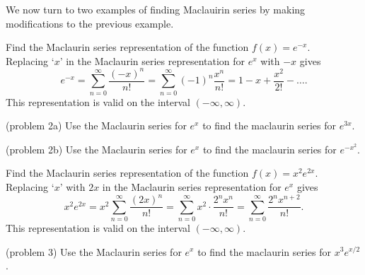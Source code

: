 \documentclass[handout]{ximera}
\begin{document}
We now turn to two examples of finding Maclauirin series by making modifications to the previous example.

\begin{example}[example 2] 
Find the Maclaurin series representation of the function $f(x) = e^{-x}$.\\
Replacing `$x$' in the Maclaurin series representation for $e^x$ with $-x$ gives
\[
e^{-x} = \sum_{n=0}^\infty \frac{(-x)^n}{n!} = \sum_{n=0}^\infty (-1)^n \frac{x^n}{n!} = 1 - x + \frac{x^2}{2!} - \dots.
\]
This representation is valid on the interval $(-\infty, \infty)$.
\end{example}

\begin{problem}(problem 2a)
Use the Maclaurin series for $e^x$ to find the maclaurin series for $e^{3x}$.
\begin{multipleChoice}
\end{multipleChoice}
\end{problem}


\begin{problem}(problem 2b)
Use the Maclaurin series for $e^x$ to find the maclaurin series for $e^{-x^2}$.
\begin{multipleChoice}
\end{multipleChoice}
\end{problem}

\begin{example}[example 3] 
Find the Maclaurin series representation of the function $f(x) = x^2 e^{2x}$.\\
Replacing `$x$' with $2x$ in the Maclaurin series representation for $e^x$ gives
\[
x^2 e^{2x} = x^2\sum_{n=0}^\infty \frac{(2x)^n}{n!} = \sum_{n=0}^\infty x^2 \cdot \frac{2^n x^n}{n!} = \sum_{n=0}^\infty \frac{2^n x^{n+2}}{n!}.
\]
This representation is valid on the interval $(-\infty, \infty)$.
\end{example}




\begin{problem}(problem 3)
Use the Maclaurin series for $e^x$ to find the maclaurin series for $x^3e^{x/2}$.
\begin{multipleChoice}
\end{multipleChoice}
\end{problem}
\end{document}

